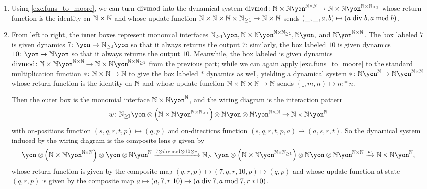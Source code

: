 \documentclass[Book-Poly]{subfiles}
\begin{document}
\begin{exercise}
\begin{solution}
\begin{enumerate}
    \item Using \cref{exc.funs_to_moore}, we can turn $\mathrm{divmod}$ into the dynamical system $\fun{divmod}\colon\nn\times\nn\yon^{\nn\times\nn}\to\nn\times\nn\yon^{\nn\times\nn_{\geq1}}$ whose return function is the identity on $\mathbb{N}\times\mathbb{N}$ and whose update function $\mathbb{N}\times\mathbb{N}\times\mathbb{N}\times\mathbb{N}_{\geq1}\to\mathbb{N}\times\mathbb{N}$ sends $(\_,\_,a,b)\mapsto(a\bdiv b,a\bmod b)$.
    \item From left to right, the inner boxes represent monomial interfaces $\nn_{\geq1}\yon, \nn\times\nn\yon^{\nn\times\nn_{\geq1}}, \nn\yon,$ and $\nn\yon^{\nn\times\nn}$.
    The box labeled $7$ is given dynamics $7\colon\yon\to\nn_{\geq1}\yon$ so that it always returns the output $7$; similarly, the box labeled $10$ is given dynamics $10\colon\yon\to\nn\yon$ so that it always returns the output $10$.
    Meanwhile, the box labeled is given dynamics $\fun{divmod}\colon\nn\times\nn\yon^{\nn\times\nn}\to\nn\times\nn\yon^{\nn\times\nn_{\geq1}}$ from the previous part; while we can again apply \cref{exc.funs_to_moore} to the standard multiplication function $*\colon\mathbb{N}\times\mathbb{N}\to\mathbb{N}$ to give the box labeled $*$ dynamics as well, yielding a dynamical system $*\colon\nn\yon^\nn\to\nn\yon^{\nn\times\nn}$ whose return function is the identity on $\mathbb{N}$ and whose update function $\mathbb{N}\times\mathbb{N}\times\mathbb{N}\to\mathbb{N}$ sends $(\_,m,n)\mapsto m*n$.
    
    Then the outer box is the monomial interface $\nn\times\nn\yon^\nn$, and the wiring diagram is the interaction pattern
    \[
        w\colon\nn_{\geq1}\yon\otimes\left(\nn\times\nn\yon^{\nn\times\nn_{\geq1}}\right)\otimes\nn\yon\otimes\nn\yon^{\nn\times\nn}\to\nn\times\nn\yon^\nn
    \]
    with on-positions function $(s,q,r,t,p)\mapsto(q,p)$ and on-directions function $(s,q,r,t,p,a)\mapsto(a,s,r,t)$.
    So the dynamical system induced by the wiring diagram is the composite lens $\phi$ given by
    \[
        \yon\otimes\left(\nn\times\nn\yon^{\nn\times\nn}\right)\otimes\yon\otimes\nn\yon^\nn\To{7\otimes\fun{divmod}\otimes10\otimes*}\nn_{\geq1}\yon\otimes\left(\nn\times\nn\yon^{\nn\times\nn_{\geq1}}\right)\otimes\nn\yon\otimes\nn\yon^{\nn\times\nn}\To{w}\nn\times\nn\yon^\nn,
    \]
    whose return function is given by the composite map $(q,r,p)\mapsto(7,q,r,10,p)\mapsto(q,p)$ and whose update function at state $(q,r,p)$ is given by the composite map $a\mapsto(a,7,r,10)\mapsto(a\bdiv7,a\bmod7,r*10)$.
    

\end{enumerate}
\end{solution}
\end{exercise}
\end{document}
